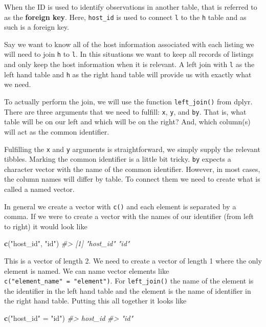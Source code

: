 \documentclass[
]{book}
\newenvironment{Shaded}{\begin{snugshade}}{\end{snugshade}}
\newcommand{\CommentTok}[1]{\textcolor[rgb]{0.56,0.35,0.01}{\textit{#1}}}
\newcommand{\KeywordTok}[1]{\textcolor[rgb]{0.13,0.29,0.53}{\textbf{#1}}}
\newcommand{\NormalTok}[1]{#1}
\newcommand{\StringTok}[1]{\textcolor[rgb]{0.31,0.60,0.02}{#1}}
\begin{document}
When the ID is used to identify observations in another table, that is referred to as the \textbf{foreign key}. Here, \texttt{host\_id} is used to connect \texttt{l} to the \texttt{h} table and as such is a foreign key.

Say we want to know all of the host information associated with each listing we will need to join \texttt{h} to \texttt{l}. In this situations we want to keep all records of listings and only keep the host information when it is relevant. A left join with \texttt{l} as the left hand table and \texttt{h} as the right hand table will provide us with exactly what we need.

To actually perform the join, we will use the function \texttt{left\_join()} from dplyr. There are three arguments that we need to fulfill: \texttt{x}, \texttt{y}, and \texttt{by}. That is, what table will be on our left and which will be on the right? And, which column(s) will act as the common identifier.

Fulfilling the \texttt{x} and \texttt{y} arguments is straightforward, we simply supply the relevant tibbles. Marking the common identifier is a little bit tricky. \texttt{by} expects a character vector with the name of the common identifier. However, in most cases, the column names will differ by table. To connect them we need to create what is called a named vector.

In general we create a vector with \texttt{c()} and each element is separated by a comma. If we were to create a vector with the names of our identifier (from left to right) it would look like

\begin{Shaded}
\begin{Highlighting}[]
\KeywordTok{c}\NormalTok{(}\StringTok{"host\_id"}\NormalTok{, }\StringTok{"id"}\NormalTok{)}
\CommentTok{\#\textgreater{} [1] "host\_id" "id"}
\end{Highlighting}
\end{Shaded}

This is a vector of length 2. We need to create a vector of length 1 where the only element is named. We can name vector elements like \texttt{c("element\_name"\ =\ "element")}. For \texttt{left\_join()} the name of the element is the identifier in the left hand table and the element is the name of identifier in the right hand table. Putting this all together it looks like

\begin{Shaded}
\begin{Highlighting}[]
\KeywordTok{c}\NormalTok{(}\StringTok{"host\_id"}\NormalTok{ =}\StringTok{ "id"}\NormalTok{)}
\CommentTok{\#\textgreater{} host\_id }
\CommentTok{\#\textgreater{}    "id"}
\end{Highlighting}
\end{Shaded}
\end{document}
